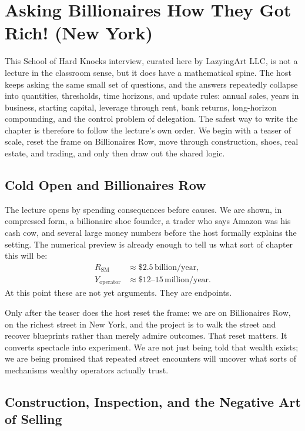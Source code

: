 \chapter{Asking Billionaires How They Got Rich! (New York)}

This School of Hard Knocks interview, curated here by LazyingArt LLC, is not a lecture in the classroom sense, but it does have a mathematical spine. The host keeps asking the same small set of questions, and the answers repeatedly collapse into quantities, thresholds, time horizons, and update rules: annual sales, years in business, starting capital, leverage through rent, bank returns, long-horizon compounding, and the control problem of delegation. The safest way to write the chapter is therefore to follow the lecture's own order. We begin with a teaser of scale, reset the frame on Billionaires Row, move through construction, shoes, real estate, and trading, and only then draw out the shared logic.

\section{Cold Open and Billionaires Row}

The lecture opens by spending consequences before causes. We are shown, in compressed form, a billionaire shoe founder, a trader who says Amazon was his cash cow, and several large money numbers before the host formally explains the setting. The numerical preview is already enough to tell us what sort of chapter this will be:
\begin{align}
R_{\text{SM}} &\approx \$2.5\,\text{billion/year},\\
Y_{\text{operator}} &\approx \$12\text{--}15\,\text{million/year}.
\end{align}
At this point these are not yet arguments. They are endpoints.

Only after the teaser does the host reset the frame: we are on Billionaires Row, on the richest street in New York, and the project is to walk the street and recover blueprints rather than merely admire outcomes. That reset matters. It converts spectacle into experiment. We are not just being told that wealth exists; we are being promised that repeated street encounters will uncover what sorts of mechanisms wealthy operators actually trust.

\section{Construction, Inspection, and the Negative Art of Selling}

